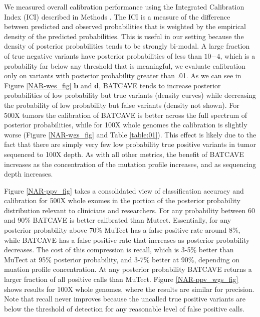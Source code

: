 \documentclass[a4,center,fleqn]{NAR}
\newcommand{\batcave}{BATCAVE }
\begin{document}
We measured overall calibration performance using the Integrated Calibration Index (ICI) described in Methods \citep{Austin2019}.
The ICI is a measure of the difference between predicted and observed probabilities that is weighted by the empirical density of the predicted probabilities.
This is useful in our setting because the density of posterior probabilities tends to be strongly bi-modal.
A large fraction of true negative variants have posterior probabilities of less than $10{-4}$, which is a probability far below any threshold that is meaningful, we evaluate calibration only on variants with posterior probability greater than .01.
As we can see in Figure \ref{NAR-wes_fig} \textbf{b} and \textbf{d}, \batcave tends to increase posterior probabilities of low probability but true variants (density curves) while decreasing the probability of low probability but false variants (density not shown).
For 500X tumors the calibration of \batcave is better across the full spectrum of posterior probabilities, while for 100X whole genomes the calibration is slightly worse (Figure \ref{NAR-wgs_fig} and Table \ref{table:01}).
This effect is likely due to the fact that there are simply very few low probability true positive variants in tumor sequenced to 100X depth.
As with all other metrics, the benefit of \batcave increases as the concentration of the mutation profile increases, and as sequencing depth increases.

Figure \ref{NAR-ppv_fig} takes a consolidated view of classification accuracy and calibration for 500X whole exomes in the portion of the posterior probability distribution relevant to clinicians and researchers.
For any probability between 60 and 90\% \batcave is better calibrated than Mutect.
Essentially, for any posterior probability above 70\% MuTect has a false positive rate around 8\%, while \batcave has a false positive rate that increases as posterior probability decreases.
The cost of this compression is recall, which is 3-5\% better than MuTect at 95\% posterior probability, and 3-7\% better at 90\%, depending on muation profile concentration.
At any posterior probability \batcave returns a larger fraction of all positive calls than MuTect.
Figure \ref{NAR-ppv_wgs_fig} shows results for 100X whole genomes, where the results are similar for precision.
Note that recall never improves because the uncalled true positive variants are below the threshold of detection for any reasonable level of false positive calls.
\end{document}
